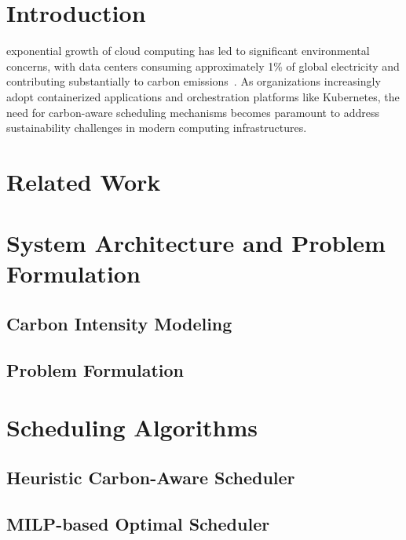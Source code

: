 \documentclass[journal]{IEEEtran}
\begin{document}
\IEEEpeerreviewmaketitle

\section{Introduction}
 exponential growth of cloud computing has led to significant environmental concerns, with data centers consuming approximately 1\% of global electricity and contributing substantially to carbon emissions~\cite{masanet2020recalibrating}. As organizations increasingly adopt containerized applications and orchestration platforms like Kubernetes, the need for carbon-aware scheduling mechanisms becomes paramount to address sustainability challenges in modern computing infrastructures.


\section{Related Work}

\section{System Architecture and Problem Formulation}

\subsection{Carbon Intensity Modeling}

\subsection{Problem Formulation}

\section{Scheduling Algorithms}

\subsection{Heuristic Carbon-Aware Scheduler}

\subsection{MILP-based Optimal Scheduler}
\end{document}
